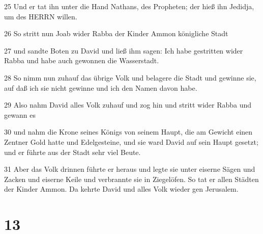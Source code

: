 \par 25 Und er tat ihn unter die Hand Nathans, des Propheten; der hieß ihn Jedidja, um des HERRN willen.
\par 26 So stritt nun Joab wider Rabba der Kinder Ammon königliche Stadt
\par 27 und sandte Boten zu David und ließ ihm sagen: Ich habe gestritten wider Rabba und habe auch gewonnen die Wasserstadt.
\par 28 So nimm nun zuhauf das übrige Volk und belagere die Stadt und gewinne sie, auf daß ich sie nicht gewinne und ich den Namen davon habe.
\par 29 Also nahm David alles Volk zuhauf und zog hin und stritt wider Rabba und gewann es
\par 30 und nahm die Krone seines Königs von seinem Haupt, die am Gewicht einen Zentner Gold hatte und Edelgesteine, und sie ward David auf sein Haupt gesetzt; und er führte aus der Stadt sehr viel Beute.
\par 31 Aber das Volk drinnen führte er heraus und legte sie unter eiserne Sägen und Zacken und eiserne Keile und verbrannte sie in Ziegelöfen. So tat er allen Städten der Kinder Ammon. Da kehrte David und alles Volk wieder gen Jerusalem.

\chapter{13}

